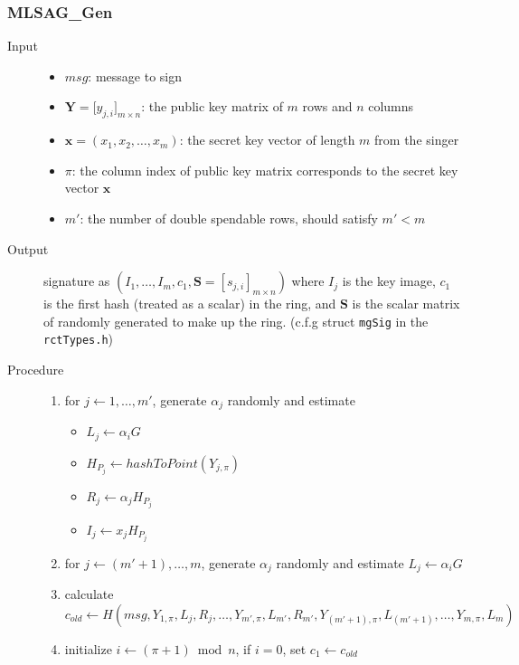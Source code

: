 \subsubsection{MLSAG\_Gen} 
	\begin{description}
		\item[Input]
			\begin{itemize}
				\item \(msg\): message to sign
				\item \(\mathbf{Y}=\Big[y_{j,i}\Big]_{m\times n}\): the public key matrix of \(m\) rows and \(n\) columns
				\item \(\mathbf{x}=(x_1,x_2,\dots,x_m)\): the secret key vector of length \(m\) from the singer 
				\item \(\pi\): the column index of public key matrix corresponds to the secret key vector \(\mathbf{x}\)
				\item \(m'\): the number of double spendable rows, should satisfy \(m'<m\)
			\end{itemize}
		\item[Output] signature as \( (I_1,\dots,I_m,c_1,\mathbf{S}=[s_{j,i}]_{m\times n})\) where \(I_j\) is the key image, \(c_1\) is the first hash (treated as a scalar) in the ring, and \(\mathbf{S}\) is the scalar matrix of randomly generated to make up the ring. (c.f.g struct \texttt{mgSig} in the \texttt{rctTypes.h})
		\item[Procedure]
			\begin{enumerate}
				\item for \(j\leftarrow 1,\dots,m'\), generate \(\alpha_j\) randomly and estimate 
					\begin{itemize}
						\item \(L_j\leftarrow\alpha_i G\)
						\item \(H_{P_j}\leftarrow hashToPoint(Y_{j,\pi})\)
						\item \(R_j \leftarrow \alpha_j H_{P_j}\)
						\item \(I_j\leftarrow x_j H_{P_j}\)
					\end{itemize}
				\item for \(j\leftarrow(m'+1),\dots,m\), generate \(\alpha_j\) randomly and estimate \(L_j\leftarrow\alpha_i G\)
				\item calculate \(c_{old}\leftarrow H(msg,Y_{1,\pi},L_j,R_j,\dots,Y_{m',\pi},L_{m'},R_{m'},Y_{(m'+1),\pi},L_{(m'+1)},\dots,Y_{m,\pi},L_{m})\)
				\item initialize \(i\leftarrow(\pi+1)\bmod n\), if \(i=0\), set \(c_1\leftarrow c_{old}\)

\end{enumerate}
\end{description}
